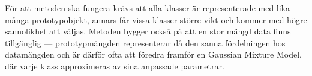 \documentclass[../rapport_MVEX01-11-05]{subfiles}
\begin{document}
För att metoden ska fungera krävs att alla klasser är representerade med lika
många prototypobjekt, annars får vissa klasser större vikt och kommer med högre
sannolikhet att väljas. Metoden bygger också på att en stor mängd data finns
tillgänglig --- prototypmängden representerar då den sanna
fördelningen hos datamängden
och är därför ofta att föredra framför en Gaussian Mixture Model, där
varje klass
approximeras av sina anpassade parametrar.

%

\end{document}
